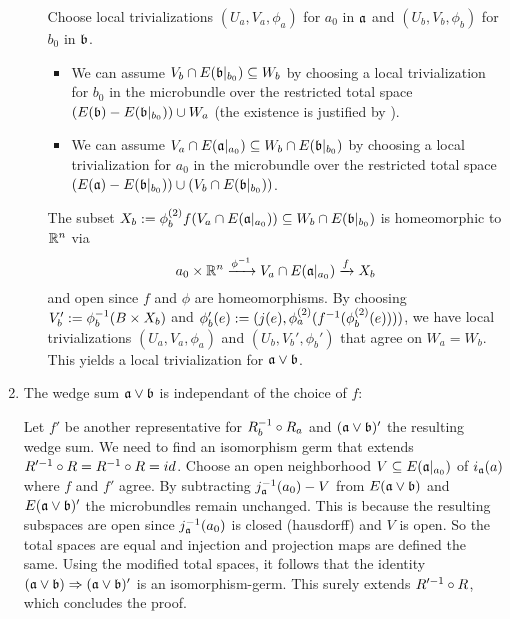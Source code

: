 \begin{myproof}
\begin{enumerate}
\begin{itemize}
            Choose local trivializations $(U_a, V_a, \phi_a)$ for $a_0$ in $\mathfrak{a}$ and $(U_b, V_b, \phi_b)$ for $b_0$ in $\mathfrak{b}$.
            \begin{itemize}
                \item We can assume $V_b \cap E(\mathfrak{b}\vert_{b_0}) \subseteq{} W_b$ by choosing a local trivialization for $b_0$ in
                the microbundle over the restricted total space
                $(E(\mathfrak{b}) - E(\mathfrak{b}\vert_{b_0})) \cup W_a$ (the existence is justified by ).
                \item We can assume $V_a \cap E(\mathfrak{a}\vert_{a_0}) \subseteq{} W_b \cap E(\mathfrak{b}\vert_{b_0})$ by choosing a local trivialization for $a_0$ in
                the microbundle over the restricted total space $(E(\mathfrak{a}) - E(\mathfrak{b}\vert_{b_0})) \cup (V_b \cap E(\mathfrak{b}\vert_{b_0}))$.
            \end{itemize}
            The subset $X_b := \phi_b^{(2)}f(V_a \cap E(\mathfrak{a}\vert_{a_0})) \subseteq{} W_b \cap E(\mathfrak{b}\vert_{b_0})$ is homeomorphic to $\mathbb{R}^n$ via
            \[ a_0 \times \mathbb{R}^n \xrightarrow{\phi^{-1}} V_a \cap E(\mathfrak{a}\vert_{a_0}) \xrightarrow{f} X_b \]
            and open since $f$ and $\phi$ are homeomorphisms.
            By choosing $V_b' := \phi_b^{-1}(B \times X_b)$ and $\phi_b'(e) := (j(e), \phi_a^{(2)}(f^{-1}(\phi_b^{(2)}(e))))$,
            we have local trivializations $(U_a, V_a, \phi_a)$ and $(U_b, V_b', \phi_b')$ that agree on $W_a = W_b$.
            This yields a local trivialization for $\mathfrak{a} \vee \mathfrak{b}$.
        \end{itemize}
        \item The wedge sum $\mathfrak{a} \vee \mathfrak{b}$ is independant of the choice of $f$:

        Let $f'$ be another representative for $R_b^{-1} \circ R_a$ and $(\mathfrak{a} \vee \mathfrak{b})'$ the resulting wedge sum.
        We need to find an isomorphism germ that extends $R'^{-1} \circ R = R^{-1} \circ R = id$.
        Choose an open neighborhood $V \subseteq{} E(\mathfrak{a}\vert_{a_0})$ of $i_{\mathfrak{a}}(a)$ where $f$ and $f'$ agree.
        By subtracting $j_{\mathfrak{a}}^{-1}(a_0) - V$ from $E(\mathfrak{a} \vee \mathfrak{b})$ and $E(\mathfrak{a} \vee \mathfrak{b})'$ the microbundles remain unchanged.
        This is because the resulting subspaces are open since $j_{\mathfrak{a}}^{-1}(a_0)$ is closed (hausdorff) and $V$ is open.
        So the total spaces are equal and injection and projection maps are defined the same.
        Using the modified total spaces, it follows that the identity $(\mathfrak{a} \vee \mathfrak{b}) \Rightarrow{} (\mathfrak{a} \vee \mathfrak{b})'$ is an isomorphism-germ.
        This surely extends $R'^{-1} \circ R$, which concludes the proof.
    \end{enumerate}
\end{myproof}